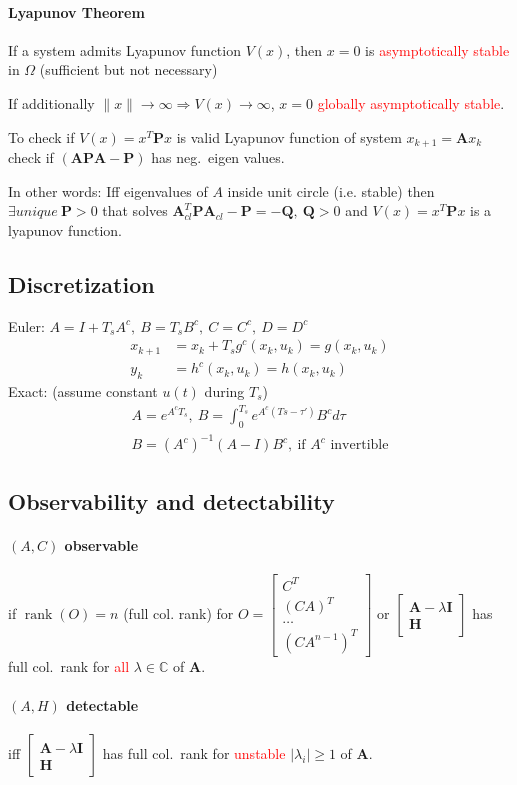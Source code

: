 \documentclass[landscape,a4paper,8pt]{scrartcl}
\renewcommand{\implies}{\Rightarrow}
\newcommand{\remph}[1]{{\textcolor{red}{#1}}}
\newcommand\vA{\bm{A}}
\newcommand\vH{\bm{H}}
\newcommand\vI{\bm{I}}
\newcommand\vP{\bm{P}}
\newcommand\vQ{\bm{Q}}
\newcommand{\Me}[1]{\begin{bmatrix}#1\end{bmatrix}} %
\DeclareMathOperator\rank{rank}
\begin{document}
\begin{multicols*}{3}
\paragraph{Lyapunov Theorem}
If a system admits Lyapunov function $V(x)$, then $x=0$ is \remph{asymptotically stable} in $\Omega$ (sufficient but not necessary)

If additionally $\lVert x \rVert \to \infty \implies V(x) \to \infty$, $x=0$ \remph{globally asymptotically stable}.

To check if $V(x) = x^T\vP x$ is valid Lyapunov function of system $x_{k+1} = \vA x_k$ check if $(\vA\vP\vA-\vP)$ has neg.\ eigen values.

In other words: Iff eigenvalues of $A$ inside unit circle (i.e. stable) then $\exists unique \ \vP>0$ that solves $\vA_{cl}^T\vP\vA_{cl}-\vP = -\vQ,\ \vQ > 0$ and $V(x) = x^T\vP x$ is a lyapunov function.

\subsection{Discretization}
Euler: $A = I + T_s A^c ,\ B = T_s B^c ,\ C = C^c ,\ D = D^c $
\begin{align*}
x_{k + 1} &= x_k + T_s g^c(x_k,u_k) = g(x_k,u_k) \\
y_{k}     &= h^c(x_k, u_k) = h(x_k, u_k)
\end{align*}
Exact: (assume constant $u(t)$ during $T_s$)
\begin{align*}
A = e^{A^cT_s},\ B = \int_0^{T_s} e^{A^c(Ts-\tau')}B^cd\tau \\
B=(A^c)^{-1}(A-I)B^c,\ \text{if $A^c$ invertible}
\end{align*}

\subsection{Observability and detectability}
\paragraph{$(A,C)$ observable}
if $\rank(O) = n$ (full col. rank) for
$O = \Me{C^T \\ (CA)^T \\ \dots \\ (CA^{n-1})^T}$ or $\Me{\vA-\lambda\vI \\ \vH}$ has full col.\ rank for \remph{all} $\lambda \in \mathbb{C}$ of $\vA$.
\paragraph{$(A,H)$ detectable}
iff $\Me{\vA-\lambda\vI \\ \vH}$ has full col.\ rank for \remph{unstable} $|\lambda_i| \geq 1$ of $\vA$.


\end{multicols*}
\end{document}
